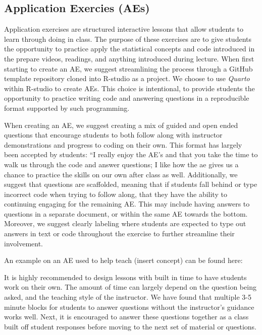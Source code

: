 \documentclass[
  12pt]{article}
\begin{document}
\hypertarget{application-exercies-aes}{%
\subsection{Application Exercies (AEs)}\label{application-exercies-aes}}

Application exercises are structured interactive lessons that allow
students to learn through doing in class. The purpose of these exercises
are to give students the opportunity to practice apply the statistical
concepts and code introduced in the prepare videos, readings, and
anything introduced during lecture. When first starting to create an AE,
we suggest streamlining the process through a GitHub template repository
cloned into R-studio as a project. We choose to use \emph{Quarto} within
R-studio to create AEs. This choice is intentional, to provide students
the opportunity to practice writing code and answering questions in a
reproducible format supported by such programming.

When creating an AE, we suggest creating a mix of guided and open ended
questions that encourage students to both follow along with instructor
demonstrations and progress to coding on their own. This format has
largely been accepted by students: ``I really enjoy the AE's and that
you take the time to walk us through the code and answer questions; I
like how the ae gives us a chance to practice the skills on our own
after class as well. Additionally, we suggest that questions are
scaffolded, meaning that if students fall behind or type incorrect code
when trying to follow along, that they have the ability to continuing
engaging for the remaining AE. This may include having answers to
questions in a separate document, or within the same AE towards the
bottom. Moreover, we suggest clearly labeling where students are
expected to type out answers in text or code throughout the exercise to
further streamline their involvement.

An example on an AE used to help teach (insert concept) can be found
here:

It is highly recommended to design lessons with built in time to have
students work on their own. The amount of time can largely depend on the
question being asked, and the teaching style of the instructor. We have
found that multiple 3-5 minute blocks for students to answer questions
without the instructor's guidance works well. Next, it is encouraged to
answer these questions together as a class built off student responses
before moving to the next set of material or questions.
\end{document}
